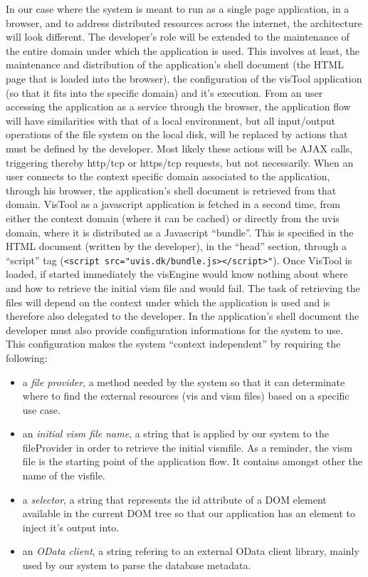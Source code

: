 In our case where the system is meant to run as a single page application, in a browser, and to address distributed resources across the internet, the architecture will look different. The developer's role will be extended to the maintenance of the entire domain under which the application is used. This involves at least, the maintenance and distribution of the application's shell document (the HTML page that is loaded into the browser), the configuration of the visTool application (so that it fits into the specific domain) and it's execution. From an user accessing the application as a service through the browser, the application flow will have similarities with that of a local environment, but all input/output operations of the file system on the local disk, will be replaced by actions that must be defined by the developer. Most likely these actions will be AJAX calls, triggering thereby http/tcp or https/tcp requests, but not necessarily. When an user connects to the context specific domain associated to the application, through his browser, the application's shell document is retrieved from that domain. VisTool as a javascript application is fetched in a second time, from either the context domain (where it can be cached) or directly from the uvis domain, where it is distributed as a Javascript ``bundle''. This is specified in the HTML document (written by the developer), in the ``head'' section, through a ``script'' tag (\texttt{<script src="uvis.dk/bundle.js></script>"}). Once VisTool is loaded, if started immediately the visEngine would know nothing about where and how to retrieve the initial vism file and would fail. The task of retrieving the files will depend on the context under which the application is used and is therefore also delegated to the developer. In the application's shell document the developer must also provide configuration informations for the system to use. This configuration makes the system ``context independent'' by requiring the following:
\begin{itemize}
    \item a \emph{file provider}, a method needed by the system so that it can determinate where to find the external resources (vis and vism files) based on a specific use case.
    \item an \emph{initial vism file name}, a string that is applied by our system to the fileProvider in order to retrieve the initial vismfile. As a reminder, the vism file is the starting point of the application flow. It contains amongst other the name of the visfile.
    \item a \emph{selector}, a string that represents the id attribute of a DOM element available in the current DOM tree so that our application has an element to inject it's output into.
    \item an \emph{OData client}, a string refering to an external OData client library, mainly used by our system to parse the database metadata.
\end{itemize}

